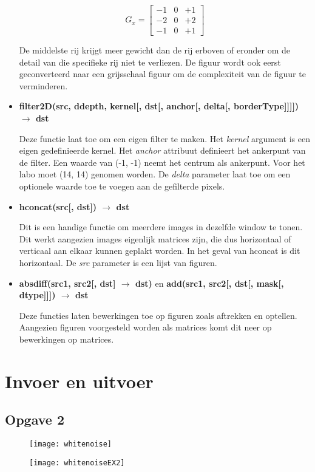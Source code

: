 \documentclass{article}
\begin{document}
\begin{itemize}
		 $$G_x = \begin{bmatrix}
		 -1 & 0 & +1 \\
		 -2 & 0 & +2 \\
		 -1 & 0 & +1 
		 \end{bmatrix}$$
		 
		 De middelste rij krijgt meer gewicht dan de rij erboven of eronder om de detail van die specifieke rij niet te verliezen. De figuur wordt ook eerst geconverteerd naar een grijsschaal figuur om de complexiteit van de figuur te verminderen. 
		 
		 \item \textbf{filter2D(src, ddepth, kernel[, dst[, anchor[, delta[, borderType]]]]) $\rightarrow$ dst}
		 
		 Deze functie laat toe om een eigen filter te maken. Het \textit{kernel} argument is een eigen gedefinieerde kernel. Het \textit{anchor} attribuut definieert het ankerpunt van de filter. Een waarde van (-1, -1) neemt het centrum als ankerpunt. Voor het labo moet (14, 14) genomen worden. De \textit{delta} parameter laat toe om een optionele waarde toe te voegen aan de gefilterde pixels.
		 
		 \item \textbf{hconcat(src[, dst]) $\rightarrow$ dst}
		 
		 Dit is een handige functie om meerdere images in dezelfde window te tonen. Dit werkt aangezien images eigenlijk matrices zijn, die dus horizontaal of verticaal aan elkaar kunnen geplakt worden. In het geval van hconcat is dit horizontaal. De \textit{src} parameter is een lijst van figuren.
		
		 \item \textbf{absdiff(src1, src2[, dst] $\rightarrow$ dst)} en \textbf{add(src1, src2[, dst[, mask[, dtype]]]) $\rightarrow$ dst}
		 
		 Deze functies laten bewerkingen toe op figuren zoals aftrekken en optellen. Aangezien figuren voorgesteld worden als matrices komt dit neer op bewerkingen op matrices.
		
		
	\end{itemize}
\newpage
	\section{Invoer en uitvoer}

	\subsection*{Opgave 2}
	\begin{figure}[!htb]
		\begin{minipage}{0.48\textwidth}
			\centering
			\texttt{[image: whitenoise]}
			\caption*{}
			\label{Fig:ex2_1}
		\end{minipage}\hfill
		\begin{minipage}{0.48\textwidth}
			\centering
			\texttt{[image: whitenoiseEX2]}
			\caption*{}
			\label{Fig:ex2_2}
		\end{minipage}
	\end{figure}
\end{document}
